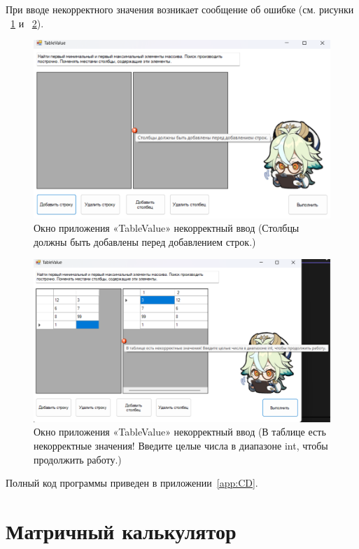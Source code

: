 \documentclass[bachelor, och, pract, times]{SCWorks}
\begin{document}
При вводе некорректного значения возникает сообщение об ошибке (см.
рисунки ~\ref{fig:table2-04} и  ~\ref{fig:table2-05}).

\begin{figure}[H]
    \centering
    \includegraphics[scale=0.5]{Скрины/Снимок экрана 2025-01-05 121940.png}
    \caption{Окно приложения «TableValue» некорректный ввод (Столбцы должны быть добавлены перед добавлением строк.)}\label{fig:table2-04}
\end{figure}

\begin{figure}[H]
    \centering
    \includegraphics[scale=0.5]{Скрины/Снимок экрана 2025-01-05 121857.png}
    \caption{Окно приложения «TableValue» некорректный ввод (В таблице есть некорректные значения! Введите целые числа в диапазоне int, чтобы продолжить работу.)}\label{fig:table2-05}
\end{figure}


Полный код программы приведен в приложении~\ref{app:CD}.

\section{Матричный калькулятор}
\end{document}
